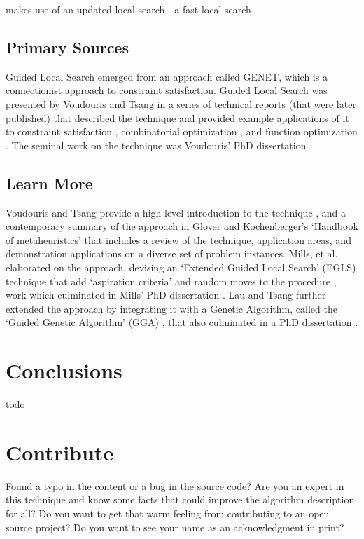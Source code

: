 \documentclass[a4paper, 11pt]{article}
\begin{document}
makes use of an updated local search - a fast local search


% 
% 
\subsection{Primary Sources}
Guided Local Search emerged from an approach called GENET, which is a connectionist approach to constraint satisfaction.
Guided Local Search was presented by Voudouris and Tsang in a series of technical reports (that were later published) that described the technique and provided example applications of it to constraint satisfaction \cite{Voudouris1994}, combinatorial optimization \cite{Voudouris1995b, Voudouris1995}, and function optimization \cite{Voudouris1995a}.
The seminal work on the technique was Voudouris' PhD dissertation \cite{Voudouris1997}.


% 
% 
\subsection{Learn More}
Voudouris and Tsang provide a high-level introduction to the technique \cite{Voudouris1998}, and a contemporary summary of the approach in Glover and Kochenberger's `Handbook of metaheuristics' \cite{Glover2003a} that includes a review of the technique, application areas, and demonstration applications on a diverse set of problem instances.
Mills, et al. elaborated on the approach, devising an `Extended Guided Local Search' (EGLS) technique that add `aspiration criteria' and random moves to the procedure \cite{Mills2003}, work which culminated in Mills' PhD dissertation \cite{Mills2002}.  
Lau and Tsang further extended the approach by integrating it with a Genetic Algorithm, called the `Guided Genetic Algorithm' (GGA) \cite{Lau1998}, that also culminated in a PhD dissertation \cite{Lau1999}.

% 
% 
\section{Conclusions}
\label{sec:conclusions}
todo

% 
% 
\section{Contribute}
\label{sec:contribute}
Found a typo in the content or a bug in the source code? 
Are you an expert in this technique and know some facts that could improve the algorithm description for all?
Do you want to get that warm feeling from contributing to an open source project? 
Do you want to see your name as an acknowledgment in print?
\end{document}
